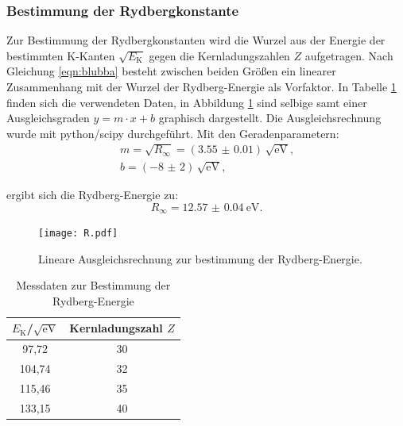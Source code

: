 \subsubsection{Bestimmung der Rydbergkonstante}
Zur Bestimmung der Rydbergkonstanten wird die Wurzel aus der Energie der bestimmten K-Kanten $\sqrt{E_\mathrm{K}}$ gegen die Kernladungszahlen $Z$ aufgetragen.
Nach Gleichung \eqref{eqn:blubba} besteht zwischen beiden Größen ein linearer Zusammenhang mit der Wurzel der Rydberg-Energie als Vorfaktor.
In Tabelle \ref{tab:ryd} finden sich die verwendeten Daten, in Abbildung \ref{fig:ryddi} sind selbige samt einer Ausgleichsgraden $y=m\cdot x+b$ graphisch dargestellt.
Die Ausgleichsrechnung wurde mit python/scipy \cite{scipy} durchgeführt.
Mit den Geradenparametern:
\begin{gather*}
	m=\sqrt{R_{\infty}}=\left(\num{3.55(1)}\right)\,\sqrt{\si{\electronvolt}} \text{,}\\
	b= \left(\num{-8(2)}\right)\,\sqrt{\si{\electronvolt}} \text{,}
\end{gather*}

ergibt sich die Rydberg-Energie zu:
\begin{equation}
R_{\infty}= \SI{12.57(4)}{\electronvolt}\text{.}
\end{equation}
\begin{figure}
	\centering
	\texttt{[image: R.pdf]}
	\caption{Lineare Ausgleichsrechnung zur bestimmung der Rydberg-Energie.}
	\label{fig:ryddi}
\end{figure}

\begin{table}
	\centering
	\caption{Messdaten zur Bestimmung der Rydberg-Energie}
	\label{tab:ryd}
\begin{tabular}{cc}
\toprule
$E_\mathrm{K}$/$\sqrt{\si{\electronvolt}}$& Kernladungszahl $Z$ \\
\midrule
97,72 & 30 \\
104,74 & 32 \\
115,46 & 35 \\
133,15 & 40 \\
\bottomrule
\end{tabular}
\end{table}
